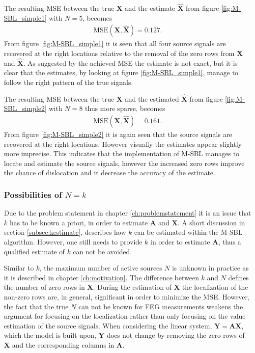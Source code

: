 \noindent
The resulting MSE between the true $\mathbf{X}$ and the estimate $\hat{\mathbf{X}}$ from figure \ref{fig:M-SBL_simple1} with $N = 5$, becomes 
\begin{align*}
\text{MSE}(\mathbf{X}, \hat{\mathbf{X}}) = 0.127.
\end{align*}
From figure \ref{fig:M-SBL_simple1} it is seen that all four source signals are recovered at the right locations relative to the removal of the zero rows from $\mathbf{X}$ and $\hat{\mathbf{X}}$. 
As suggested by the achieved MSE the estimate is not exact, but it is clear that the estimates, by looking at figure \ref{fig:M-SBL_simple1}, manage to follow the right pattern of the true signals. 

The resulting MSE between the true $\mathbf{X}$ and the estimated $\hat{\mathbf{X}}$ from figure \ref{fig:M-SBL_simple2} with $N = 8$ thus more sparse, becomes 
\begin{align*}
\text{MSE}(\mathbf{X}, \hat{\mathbf{X}}) = 0.161. 
\end{align*}
From figure \ref{fig:M-SBL_simple2} it is again seen that the source signals are recovered at the right locations. 
However visually the estimates appear slightly more imprecise. 
This indicates that the implementation of M-SBL manages to locate and estimate the source signals, however the increased zero rows improve the chance of dislocation and it decrease the accuracy of the estimate.     

\subsubsection*{Possibilities of $N=k$}
Due to the problem statement in chapter \ref{ch:problemstatement} it is an issue that $k$ has to be known a priori, in order to estimate $\mathbf{A}$ and $\mathbf{X}$. 
A short discussion in section \ref{subsec:kestimate}, describes how $k$ can be estimated within the M-SBL algorithm. 
However, one still needs to provide $k$ in order to estimate $\mathbf{A}$, thus a qualified estimate of $k$ can not be avoided. 

Similar to $k$, the maximum number of active sources $N$ is unknown in practice as it is described in chapter \ref{ch:motivation}. 
The difference between $k$ and $N$ defines the number of zero rows in $\mathbf{X}$.
During the estimation of $\mathbf{X}$ the localization of the non-zero rows are, in general, significant in order to minimize the MSE. 
However, the fact that the true $N$ can not be known for EEG measurements weakens the argument for focusing on the localization rather than only focusing on the value estimation of the source signals. 
When considering the linear system, $\mathbf{Y} = \mathbf{AX}$, which the model is built upon, $\mathbf{Y}$ does not change by removing the zero rows of $\mathbf{X}$ and the corresponding columns in $\mathbf{A}$.

